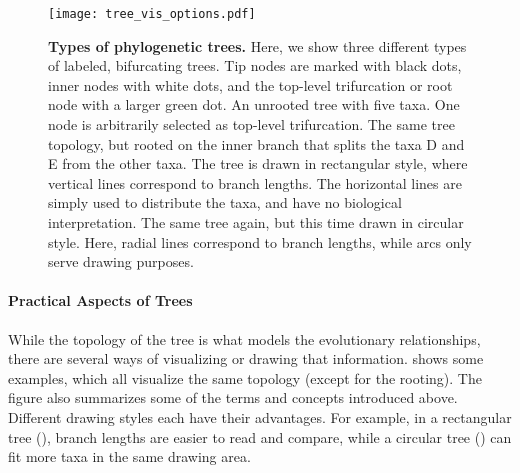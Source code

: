 \begin{figure}[thpb]
    \centering
    \texttt{[image: tree\_vis\_options.pdf]}
    \begin{subfigure}{0pt}
        \label{fig:tree_vis_options:sub:unrooted}
    \end{subfigure}
    \begin{subfigure}{0pt}
        \label{fig:tree_vis_options:sub:rectangular}
    \end{subfigure}
    \begin{subfigure}{0pt}
        \label{fig:tree_vis_options:sub:circular}
    \end{subfigure}
    \caption[Types of phylogenetic trees]{
        \textbf{Types of phylogenetic trees.}
        Here, we show three different types of labeled, bifurcating trees.
        Tip nodes are marked with black dots, inner nodes with white dots,
        and the top-level trifurcation or root node with a larger green dot.
        An unrooted tree with five taxa. One node is arbitrarily selected as top-level trifurcation.
        The same tree topology,
        but rooted on the inner branch that splits the taxa {\sffamily D} and {\sffamily E} from the other taxa.
        The tree is drawn in rectangular style,
        where vertical lines correspond to branch lengths.
        The horizontal lines are simply used to distribute the taxa, and have no biological interpretation.
        The same tree again, but this time drawn in circular style.
        Here, radial lines correspond to branch lengths, while arcs only serve drawing purposes.
    }
    \label{fig:tree_vis_options}
\end{figure}

\paragraph{Practical Aspects of Trees}
\label{ch:Foundations:sec:TreeOfLife:sub:PhylogeneticTrees:par:PracticalAspects}

While the topology of the tree is what models the evolutionary relationships,
there are several ways of visualizing or drawing that information.
 shows some examples, which all visualize the same topology (except for the rooting).
The figure also summarizes some of the terms and concepts introduced above.
Different drawing styles each have their advantages.
For example, in a rectangular tree (),
branch lengths are easier to read and compare,
while a circular tree () can fit more taxa in the same drawing area.

